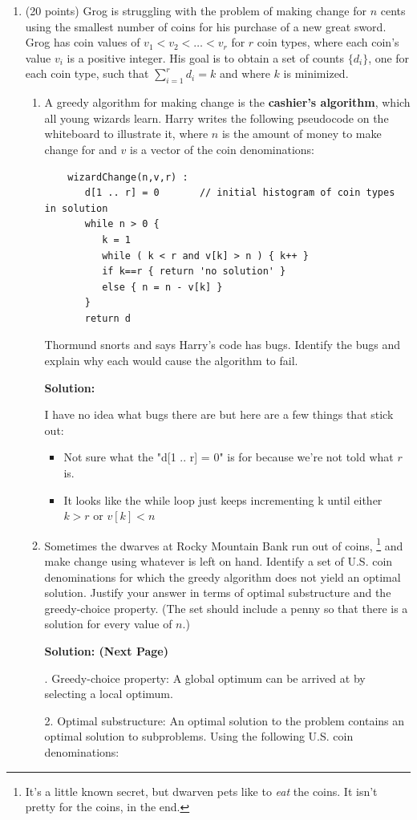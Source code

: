 \documentclass[12pt]{article}
\begin{document}
\begin{enumerate}
	\newpage
	\item (20 points) Grog is struggling with the problem of making change for $n$ cents using the smallest number of coins for his purchase of a new great sword. Grog has coin values of $v_{1}<v_{2}<\dots<v_{r}$ for $r$ coin types, where each coin's value $v_{i}$ is a positive integer. His goal is to obtain a set of counts $\{d_{i}\}$, one for each coin type, such that $\sum_{i=1}^{r}d_{i}=k$ and where $k$ is minimized.
	\begin{enumerate}
	\item A greedy algorithm for making change is the \textbf{cashier's algorithm}, which all young wizards learn. Harry writes the following pseudocode on the whiteboard to illustrate it, where $n$ is the amount of money to make change for and $v$ is a vector of the coin denominations:
	\begin{small}
	\begin{verbatim}
	wizardChange(n,v,r) :
	   d[1 .. r] = 0       // initial histogram of coin types in solution
	   while n > 0 {
	      k = 1
	      while ( k < r and v[k] > n ) { k++ }
	      if k==r { return 'no solution' }
	      else { n = n - v[k] }
	   }
	   return d
	\end{verbatim}
	\end{small}
    Thormund snorts and says Harry's code has bugs. Identify the bugs and explain why each would cause the algorithm to fail.\par
    \textbf{Solution:}\par
        I have no idea what bugs there are but here are a few things that stick out:\par
        \begin{itemize}
            \item Not sure what the "d[1 .. r] = 0" is for because we're not told what $r$ is.
            \item It looks like the while loop just keeps incrementing k until either $k>r$ or $v[k]<n$ 
        \end{itemize}
	\item Sometimes the dwarves at Rocky Mountain Bank run out of coins,%
	\footnote{It's a little known secret, but dwarven pets like to \textit{eat} the coins. It isn't pretty for the coins, in the end.}
    and make change using whatever is left on hand. Identify a set of U.S. coin denominations for which the greedy algorithm does not 
    yield an optimal solution. Justify your answer in terms of optimal substructure and the greedy-choice property. 
    (The set should include a penny so that there is a solution for every value of $n$.)\par
    \textbf{Solution: (Next Page)}\par
    . Greedy-choice property: A global optimum can be arrived at by selecting a local optimum.\par
    2. Optimal substructure: An optimal solution to the problem contains an optimal solution to subproblems.
    Using the following U.S. coin denominations:\par


\end{enumerate}
\end{enumerate}
\end{document}
